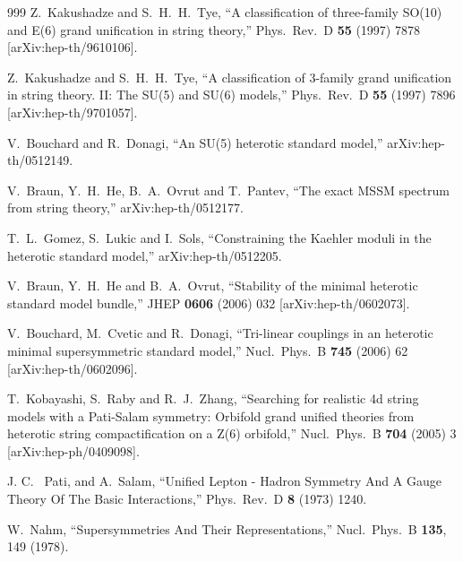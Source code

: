 \begin{thebibliography}{999}
  Z.~Kakushadze and S.~H.~H.~Tye,
  ``A classification of three-family SO(10) and E(6) grand unification  in
  string theory,''
  Phys.\ Rev.\ D {\bf 55} (1997) 7878
  [arXiv:hep-th/9610106].

  Z.~Kakushadze and S.~H.~H.~Tye,
  ``A classification of 3-family grand unification in string theory.  II: The
  SU(5) and SU(6) models,''
  Phys.\ Rev.\ D {\bf 55} (1997) 7896
  [arXiv:hep-th/9701057].

  V.~Bouchard and R.~Donagi,
  ``An SU(5) heterotic standard model,''
  arXiv:hep-th/0512149.

  V.~Braun, Y.~H.~He, B.~A.~Ovrut and T.~Pantev,
  ``The exact MSSM spectrum from string theory,''
  arXiv:hep-th/0512177.

  T.~L.~Gomez, S.~Lukic and I.~Sols,
  ``Constraining the Kaehler moduli in the heterotic standard model,''
  arXiv:hep-th/0512205.

  V.~Braun, Y.~H.~He and B.~A.~Ovrut,
  ``Stability of the minimal heterotic standard model bundle,''
  JHEP {\bf 0606} (2006) 032
  [arXiv:hep-th/0602073].

  V.~Bouchard, M.~Cvetic and R.~Donagi,
   ``Tri-linear couplings in an heterotic minimal supersymmetric standard
  model,''
  Nucl.\ Phys.\ B {\bf 745} (2006) 62
  [arXiv:hep-th/0602096].

  T.~Kobayashi, S.~Raby and R.~J.~Zhang,
  ``Searching for realistic 4d string models with a Pati-Salam symmetry:
  Orbifold grand unified theories from heterotic string compactification  on a
  Z(6) orbifold,''
  Nucl.\ Phys.\ B {\bf 704} (2005) 3
  [arXiv:hep-ph/0409098].

J. C. ~Pati,  and  A.~Salam, 
  ``Unified Lepton - Hadron Symmetry And A Gauge Theory Of The Basic
  Interactions,''
  Phys.\ Rev.\ D {\bf 8} (1973) 1240.

  W.~Nahm,
  ``Supersymmetries And Their Representations,''
  Nucl.\ Phys.\ B {\bf 135}, 149 (1978).


\end{thebibliography}
